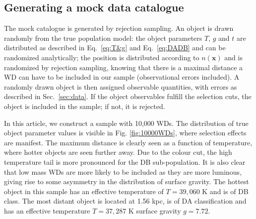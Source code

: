 \documentclass[fleqn,usenatbib]{mnras}
\newcommand{\Teff}{T}
\newcommand{\logg}{g}
\begin{document}
\subsection{Generating a mock data catalogue}

The mock catalogue is generated by rejection sampling. An object is drawn randomly from the true population model: the object parameters $\Teff$, $\logg$ and $t$ are distributed as described in Eq.~\eqref{eq:T&g} and Eq.~\eqref{eq:DADB} and can be randomized analytically; the position is distributed according to $n(\mathbf{x})$ and is randomized by rejection sampling, knowing that there is a maximal distance a WD can have to be included in our sample (observational errors included). A randomly drawn object is then assigned observable quantities, with errors as described in Sec.~\ref{sec:data}. If the object observables fulfill the selection cuts, the object is included in the sample; if not, it is rejected.

In this article, we construct a sample with 10,000 WDs. The distribution of true object parameter values is visible in Fig. \ref{fig:10000WDs}, where selection effects are manifest. The maximum distance is clearly seen as a function of temperature, where hotter objects are seen further away. Due to the colour cut, the high temperature tail is more pronounced for the DB sub-population. It is also clear that low mass WDs are more likely to be included as they are more luminous, giving rise to some asymmetry in the distribution of surface gravity. The hottest object in this sample has an effective temperature of $\Teff=39,060$ K and is of DB class. The most distant object is located at 1.56 kpc, is of DA classification and has an effective temperature $\Teff=37,287$ K surface gravity $\logg=7.72$.
\end{document}
